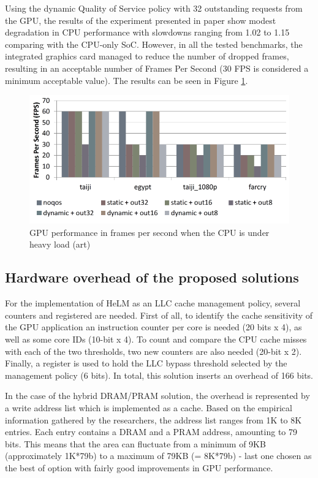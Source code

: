 \documentclass[journal]{IEEEtran}
\begin{document}
Using the dynamic Quality of Service policy with 32 outstanding requests from the GPU, the results of the experiment presented in paper \cite{QoS} show modest degradation in CPU performance with slowdowns ranging from 1.02 to 1.15 comparing with the CPU-only SoC. However, in all the tested benchmarks, the integrated graphics card managed to reduce the number of dropped frames, resulting in an acceptable number of Frames Per Second (30 FPS is considered a minimum acceptable value). The results can be seen in Figure \ref{QoSFPS}.

\begin{figure}[H]
	\centering
	\includegraphics[width = 9 cm]{graphics/QoSfpsBW.PNG}
	\caption{GPU performance in frames per second when the CPU is under heavy load (art)\cite{QoS}}\label{QoSFPS}
\end{figure}

\subsection{Hardware overhead of the proposed solutions}
For the implementation of HeLM as an LLC cache management policy, several counters and registered are needed. First of all, to identify the cache sensitivity of the GPU application an instruction counter per core is needed (20 bits x 4), as well as some core IDs (10-bit x 4). To count and compare the CPU cache misses with each of the two thresholds, two new counters are also needed (20-bit x 2). Finally, a register is used to hold the LLC bypass threshold selected by the management policy (6 bits). In total, this solution inserts an overhead of 166 bits.

In the case of the hybrid DRAM/PRAM solution, the overhead is represented by a write address list which is implemented as a cache. Based on the empirical information gathered by the researchers, the address list ranges from 1K to 8K entries. Each entry contains a DRAM and a PRAM address, amounting to 79 bits. This means that the area can fluctuate from a minimum of 9KB (approximately 1K*79b) to a maximum of 79KB (= 8K*79b) - last one chosen as the best of option with fairly good improvements in GPU performance.
\end{document}
